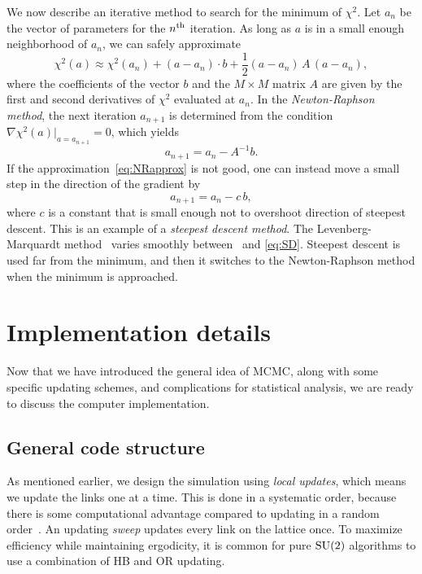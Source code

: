 We now describe an iterative method to search for the minimum of $\chi^2$.
Let $a_n$ be the vector of parameters for the $n{}^{\rm th}$ iteration.
As long as $a$ is in a small enough neighborhood of $a_n$, we can safely
approximate
\begin{equation}\label{eq:NRapprox}
  \chi^2(a)\approx\chi^2(a_n)+(a-a_n)\cdot b
           +\frac{1}{2}(a-a_n)\,A\,(a-a_n),
\end{equation}
where the coefficients of the vector $b$ and the $M\times M$ matrix $A$ 
are given by the first and second derivatives of $\chi^2$ evaluated at $a_n$.
In the {\it Newton-Raphson method}, the next 
iteration $a_{n+1}$ is
determined from the condition $\nabla\chi^2(a)|_{a=a_{n+1}}=0$,
which yields
\begin{equation}\label{eq:NR}
  a_{n+1}=a_n-A^{-1}b.
\end{equation}
If the approximation~\eqref{eq:NRapprox} is not good, one can instead move
a small step in the direction of the gradient by
\begin{equation}\label{eq:SD}
  a_{n+1}=a_n-c\,b,
\end{equation}
where $c$ is a constant that is small enough not to overshoot direction
of steepest descent. This is an example of a {\it steepest descent method}.
The Levenberg-Marquardt 
method~\cite{levenberg_method_1944,marquardt_algorithm_1963} 
varies smoothly between~ and 
\eqref{eq:SD}. Steepest descent is used far from the minimum, and 
then it switches to the Newton-Raphson method when the minimum is approached.

\section{Implementation details}\label{sec:implement}

Now that we have introduced the general idea of MCMC, along with some specific
updating schemes, and complications for statistical analysis, we are ready 
to discuss the computer implementation. 

\subsection{General code structure}

As mentioned earlier, we design the simulation using {\it local updates}, which
means we update the links one at a time. This is done in a systematic order,
because there is some computational advantage compared to updating in a
random order~\cite{berg_markov_2004}. 
An updating {\it sweep} updates every link on the lattice once. 
To maximize efficiency while maintaining ergodicity, it is common for pure
$\operatorname{SU}(2)$ algorithms to use
a combination of HB and OR updating. 


